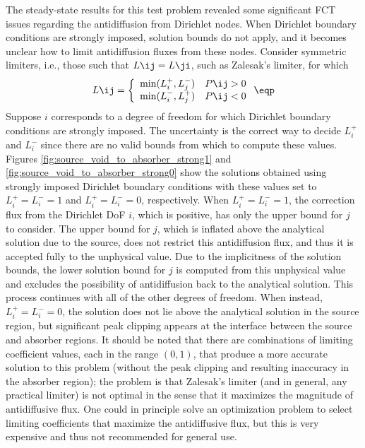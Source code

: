 The steady-state results for this test problem revealed some significant
FCT issues regarding the antidiffusion from Dirichlet nodes.
When Dirichlet boundary conditions are strongly imposed, solution
bounds do not apply, and it becomes unclear how to limit antidiffusion
fluxes from these nodes. Consider symmetric limiters, i.e., those such that
$L\ij=L\ji$, such as Zalesak's limiter, for which
\begin{equation}
  L\ij = \left\{\begin{array}{c c}
    \min(L_i^+,L_j^-) & P\ij > 0\\
    \min(L_i^-,L_j^+) & P\ij < 0\\
  \end{array}\right. \eqp
\end{equation}
Suppose $i$ corresponds to a degree of freedom for which Dirichlet
boundary conditions are strongly imposed. The uncertainty
is the correct way to decide $L_i^+$ and $L_i^-$ since there
are no valid bounds from which to compute these values.
Figures \ref{fig:source_void_to_absorber_strong1} and 
\ref{fig:source_void_to_absorber_strong0} show the solutions obtained
using strongly imposed Dirichlet boundary conditions with these
values set to $L_i^+=L_i^-=1$ and $L_i^+=L_i^-=0$, respectively.
When $L_i^+=L_i^-=1$, the correction flux from the Dirichlet
DoF $i$, which is positive, has only the upper bound for $j$
to consider. The upper bound for $j$, which is inflated above the
analytical solution due to the source, does not restrict this
antidiffusion flux, and thus it is accepted fully to the unphysical
value. Due to the implicitness of the solution bounds, the lower solution
bound for $j$ is computed from this unphysical value and excludes the
possibility of antidiffusion back to the analytical solution. This
process continues with all of the other degrees of freedom.
When instead, $L_i^+=L_i^-=0$, the solution does not lie above
the analytical solution in the source region, but significant peak
clipping appears at the interface between the source and absorber
regions. It should be noted that there are combinations of limiting
coefficient values, each in the range $(0,1)$, that produce a more
accurate solution to this problem (without the peak clipping
and resulting inaccuracy in the absorber region); the problem is that Zalesak's
limiter (and in general, any practical limiter) is not optimal
in the sense that it maximizes the magnitude of antidiffusive flux.
One could in principle solve an optimization problem to select
limiting coefficients that maximize the antidiffusive flux, but this
is very expensive and thus not recommended for general use.

